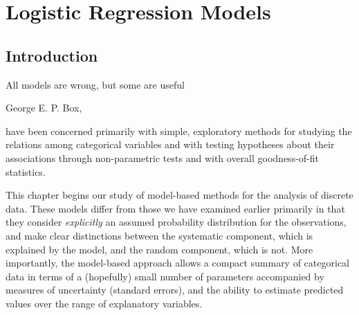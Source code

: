 \documentclass[11pt]{book}\usepackage[]{graphicx}\usepackage[]{color}
\begin{document}




\chapter{Logistic Regression Models}\label{ch:logistic}



\section{Introduction}\label{sec:logist-intro}

\epigraph{All models are wrong, but some are useful}{George E. P. Box, \citep[p. 424]{BoxDraper:1987}}

have been concerned primarily with simple,
exploratory methods for studying the relations among categorical
variables and with testing hypotheses about their associations
through non-parametric tests and with overall goodness-of-fit
statistics.

This chapter begins our study of model-based methods for the analysis
of discrete data.  These models differ from those we have examined
earlier primarily in that they consider \emph{explicitly} an
assumed probability distribution for the observations, and make
clear distinctions between the systematic component, which is
explained by the model, and the random component, which is not.
More importantly, the model-based approach allows a compact summary
of categorical data in terms of a (hopefully) small number of
parameters accompanied by measures of uncertainty (standard errors),
and the ability to estimate predicted values over the range of
explanatory variables.
\end{document}
